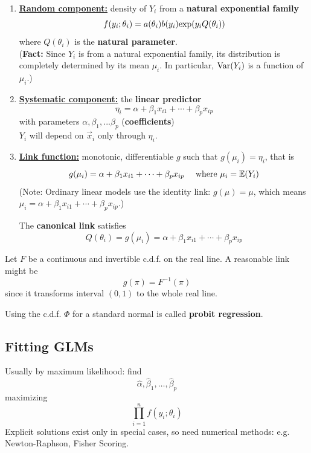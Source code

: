 \documentclass[11pt]{elegantbook}
\begin{document}
\begin{enumerate}[(1)]
    \item \textbf{\underline{Random component:}} density of $Y_i$ from a \textbf{natural exponential family} $$f(y_i;\theta_i)=a(\theta_i)b(y_i)\textnormal{exp}(y_i Q(\theta_i))$$
    where $Q(\theta_i)$ is the \textbf{natural parameter}.\\
    (\textbf{Fact:} Since $Y_i$ is from a natural exponential family, its distribution is completely determined by its mean $\mu_i$. In particular, $\textnormal{Var}(Y_i)$ is a function of $\mu_i$.)
    \item \textbf{\underline{Systematic component:}} the \textbf{linear predictor}
    $$\eta_i = \alpha+\beta_1 x_{i1}+\cdots +\beta_p x_{ip}$$
    with parameters $\alpha,\beta_1,...\beta_p$ (\textbf{coefficients})\\
    $Y_i$ will depend on $\vec{x}_i$ only through $\eta_i$.
    \item \textbf{\underline{Link function:}} monotonic, differentiable $g$ such that $g(\mu_i)=\eta_i$, that is
    $$g(\mu_i)=\alpha+\beta_1 x_{i1}+\cdots +\beta_p x_{ip}\quad \textnormal{ where }\mu_i=\mathbb{E}(Y_i)$$
    (Note: Ordinary linear models use the identity link: $g(\mu)=\mu$, which means $\mu_i=\alpha+\beta_1 x_{i1}+\cdots +\beta_p x_{ip}$.)
    \begin{definition}
        \normalfont
        The \textbf{canonical link} satisfies $$Q(\theta_i)=g(\mu_i)=\alpha+\beta_1 x_{i1}+\cdots +\beta_p x_{ip}$$
    \end{definition}
\end{enumerate}

Let $F$ be a continuous and invertible c.d.f. on the real line.
A reasonable link might be
$$
g(\pi)=F^{-1}(\pi)
$$
since it transforms interval $(0,1)$ to the whole real line.
\begin{definition}
    \normalfont
    Using the c.d.f. $\Phi$ for a standard normal is called \textbf{probit regression}.
\end{definition}


\subsection{Fitting GLMs}
Usually by maximum likelihood: find
$$
\hat{\alpha}, \hat{\beta}_1, \ldots, \hat{\beta}_p
$$
maximizing
$$
\prod_{i=1}^n f\left(y_i ; \theta_i\right)
$$
Explicit solutions exist only in special cases, so need numerical methods: e.g. Newton-Raphson, Fisher Scoring.
\end{document}
